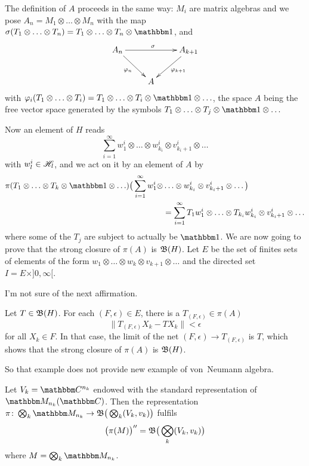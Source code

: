 The definition of $A$ proceeds in the same way: $M_i$ are matrix algebras and we pose $A_n=M_1 \otimes\ldots\otimes  M_n$ with the map $\sigma(T_1\otimes\ldots\otimes  T_n)=T_1\otimes\ldots\otimes  T_n\otimes\mtu$, and
\[ 
  \xymatrix{%
   A_n \ar[rr]^{\sigma}\ar[dr]_{\varphi_n}		&	&	A_{k+1}\ar[ld]^{\varphi_{k+1}}\\
   &							A
}
\]
with $\varphi_i(T_1\otimes\ldots\otimes  T_i)=T_1\otimes\ldots\otimes  T_i\otimes\mtu \otimes\ldots$, the space $A$ being the free vector space generated by the symbols $T_1\otimes\ldots\otimes  T_j\otimes\mtu\otimes\ldots$ 

Now an element of $H$ reads
\[ 
  \sum_{i=1}^{\infty}w_1^i\otimes\ldots\otimes  w_{k_i}^i\otimes v_{k_i+1}^i\otimes\ldots
\]
with $w_l^i\in\mathscr{H}_l$, and we act on it by an element of $A$ by
\begin{equation}
\begin{split}
\pi(T_1\otimes\ldots\otimes T_k\otimes\cun\otimes\ldots)\big( \sum_{i=1}^{\infty} w_1^i\otimes&\ldots\otimes w_{k_i}^i\otimes v_{k_i+1}^i\otimes\ldots \big)\\
		&=	\sum_{i=1}^{\infty}T_1w_1^i\otimes\ldots\otimes T_{k_i}w_{k_i}^i\otimes v_{k_i+1}^i\otimes\ldots
\end{split}
\end{equation}
where some of the $T_j$ are subject to actually be $\mtu$. We are now going to prove that the strong closure of $\pi(A)$ is $\mathfrak{B}(H)$. Let $E$ be the set of finites sets of elements of the form $w_1\otimes\ldots\otimes  w_k\otimes v_{k+1}\otimes\ldots$ and the directed set $I=E\times ]0,\infty[$.

\begin{probleme}
I'm not sure of the next affirmation.
\end{probleme}

Let $T\in\mathfrak{B}(H)$. For each $(F,\epsilon)\in E$, there is a $T_{(F,\epsilon)}\in\pi(A)$
\begin{equation}
\| T_{(F,\epsilon)}X_k-TX_k \|<\epsilon
\end{equation}
for all $X_k\in F$. In that case, the limit of the net $(F,\epsilon)\to T_{(F,\epsilon)}$ is $T$, which shows that the strong closure of $\pi(A)$ is $\mathfrak{B}(H)$.

So that example does not provide new example of von~Neumann algebra.
\begin{proposition}
Let $V_k=\eC^{n_k}$ endowed with the standard representation of $\eM_{n_k}(\eC)$. Then the representation $\pi\colon \bigotimes_k \eM_{n_k}\to \oB\big( \bigotimes_k(V_k,v_k) \big)$ fulfils 
\[ 
  \big( \pi(M) \big)''=\mathfrak{B}\big( \bigotimes_k(V_k,v_k) \big)
\]
where $M=\bigotimes_k\eM_{n_k}$.
\end{proposition}

